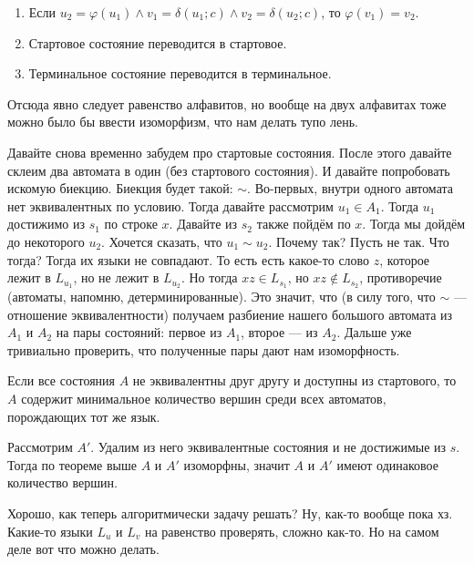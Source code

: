 \documentclass{article}
\begin{document}
\begin{itemize}
\begin{enumerate}
            \item Если $u_2=\varphi(u_1)\land v_1=\delta(u_1;c)\land v_2=\delta(u_2;c)$, то $\varphi(v_1)=v_2$.
            \item Стартовое состояние переводится в стартовое.
            \item Терминальное состояние переводится в терминальное.
        \end{enumerate}
        \begin{Comment}
            Отсюда явно следует равенство алфавитов, но вообще на двух алфавитах тоже можно было бы ввести изоморфизм, что нам делать тупо лень.
        \end{Comment}
        \begin{Proof}
            Давайте снова временно забудем про стартовые состояния. После этого давайте склеим два автомата в один (без стартового состояния). И давайте попробовать искомую биекцию. Биекция будет такой: $\sim$. Во-первых, внутри одного автомата нет эквивалентных по условию. Тогда давайте рассмотрим $u_1\in A_1$. Тогда $u_1$ достижимо из $s_1$ по строке $x$. Давайте из $s_2$ также пойдём по $x$. Тогда мы дойдём до некоторого $u_2$. Хочется сказать, что $u_1\sim u_2$. Почему так? Пусть не так. Что тогда? Тогда их языки не совпадают. То есть есть какое-то слово $z$, которое лежит в $L_{u_1}$, но не лежит в $L_{u_2}$. Но тогда $xz\in L_{s_1}$, но $xz\notin L_{s_2}$, противоречие (автоматы, напомню, детерминированные). Это значит, что (в силу того, что $\sim$ --- отношение эквивалентности) получаем разбиение нашего большого автомата из $A_1$ и $A_2$ на пары состояний: первое из $A_1$, второе --- из $A_2$. Дальше уже тривиально проверить, что полученные пары дают нам изоморфность. 
        \end{Proof}
        \thm Если все состояния $A$ не эквивалентны друг другу и доступны из стартового, то $A$ содержит минимальное количество вершин среди всех автоматов, порождающих тот же язык.
        \begin{Proof}
            Рассмотрим $A'$. Удалим из него эквивалентные состояния и не достижимые из $s$. Тогда по теореме выше $A$ и $A'$ изоморфны, значит $A$ и $A'$ имеют одинаковое количество вершин.
        \end{Proof}
        \begin{Comment}
            Хорошо, как теперь алгоритмически задачу решать? Ну, как-то вообще пока хз. Какие-то языки $L_u$ и $L_v$ на равенство проверять, сложно как-то. Но на самом деле вот что можно делать.
        \end{Comment}

\end{itemize}
\end{document}
